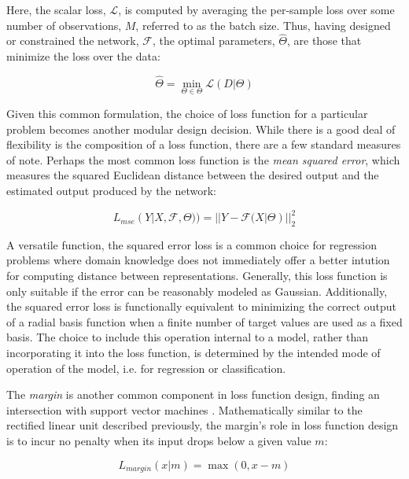 \noindent Here, the scalar loss, $\mathcal{L}$, is computed by averaging the per-sample loss over some number of observations, $M$, referred to as the batch size.
Thus, having designed or constrained the network, $\mathcal{F}$, the optimal parameters, $\hat{\Theta}$, are those that minimize the loss over the data:

\begin{equation}
\label{eq:genloss}
\hat{\Theta} = \min\limits_{\Theta \in \mathcal{\Theta}}\mathcal{L}(D | \Theta)
\end{equation}

Given this common formulation, the choice of loss function for a particular problem becomes another modular design decision.
While there is a good deal of flexibility is the composition of a loss function, there are a few standard measures of note.
Perhaps the most common loss function is the \emph{mean squared error}, which measures the squared Euclidean distance between the desired output and the estimated output produced by the network:

\begin{equation}
\label{eq:mse}
L_{mse}(Y | X, \mathcal{F}, \Theta)) = || Y - \mathcal{F}(X | \Theta) ||_2^2
\end{equation}

\noindent A versatile function, the squared error loss is a common choice for regression problems where domain knowledge does not immediately offer a better intution for computing distance between representations.
Generally, this loss function is only suitable if the error can be reasonably modeled as Gaussian.
Additionally, the squared error loss is functionally equivalent to minimizing the correct output of a radial basis function when a finite number of target values are used as a fixed basis.
The choice to include this operation internal to a model, rather than incorporating it into the loss function, is determined by the intended mode of operation of the model, i.e. for regression or classification.

The \emph{margin} is another common component in loss function design, finding an intersection with support vector machines \cite{Bishop2006Pattern}.
Mathematically similar to the rectified linear unit described previously, the margin's role in loss function design is to incur no penalty when its input drops below a given value $m$:

\begin{equation}
\label{eq:mse}
L_{margin}(x | m) = \max(0, x - m)
\end{equation}


